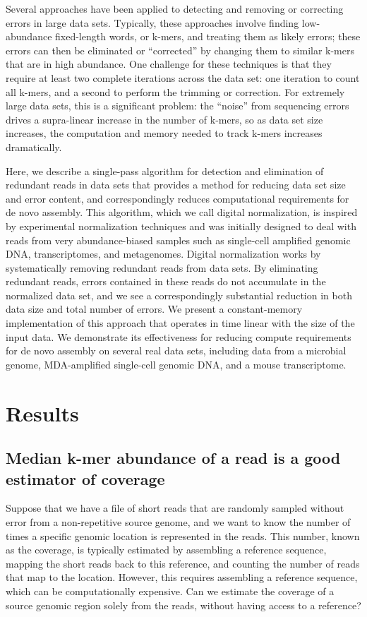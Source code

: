 \documentclass[10pt]{article}
\begin{document}
Several approaches have been applied to detecting and removing or
correcting errors in large data sets.  Typically, these approaches
involve finding low-abundance fixed-length words, or k-mers, and treating
them as likely errors; these errors can then be eliminated or
``corrected'' by changing them to similar k-mers that are in high
abundance.  One challenge for these techniques is that they
require at least two complete iterations across the data set: one
iteration to count all k-mers, and a second to perform the
trimming or correction.  For extremely large data sets, this
is a significant problem: the ``noise'' from
sequencing errors drives a supra-linear increase in the number of
k-mers, so as data set size increases, the computation and memory
needed to track k-mers increases dramatically.

Here, we describe a single-pass algorithm for detection and
elimination of redundant reads in data sets that provides a method for
reducing data set size and error content, and correspondingly reduces
computational requirements for de novo assembly.  This algorithm, which
we call digital normalization, is inspired by experimental
normalization techniques and was initially designed to deal with reads
from very abundance-biased samples such as single-cell amplified
genomic DNA, transcriptomes, and metagenomes.  Digital normalization
works by systematically removing redundant reads from data sets.
By eliminating redundant reads, errors contained in these reads do
not accumulate in the normalized data set, and we see a
correspondingly substantial reduction in both data size and total
number of errors.  We present a constant-memory implementation of this
approach that operates in time linear with the size of the input data.
We demonstrate its effectiveness for reducing compute requirements
for de novo assembly on several real data sets, including data from a
microbial genome, MDA-amplified single-cell genomic DNA, and a mouse
transcriptome.

\section*{Results}

\subsection*{Median k-mer abundance of a read is a good estimator of coverage}

Suppose that we have a file of short reads that are randomly sampled
without error from a non-repetitive source genome, and we want to know
the number of times a specific genomic location is represented in the
reads.  This number, known as the coverage, is typically estimated by
assembling a reference sequence, mapping the short reads back to this
reference, and counting the number of reads that map to the location.
However, this requires assembling a reference sequence, which can be
computationally expensive.  Can we estimate the coverage of a source
genomic region solely from the reads, without having access to a
reference?
\end{document}
